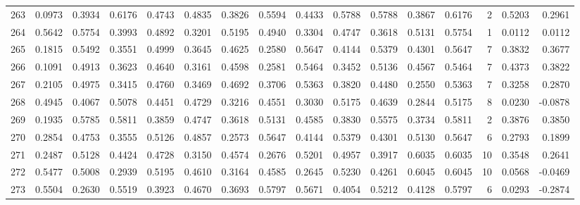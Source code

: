 \begin{tabular}{lrrrrrrrrrrrrrrr}
263 &      0.0973 &  0.3934 &  0.6176 &  0.4743 &  0.4835 &  0.3826 &  0.5594 &  0.4433 &  0.5788 &  0.5788 &   0.3867 &     0.6176 &      2 &                    0.5203 &                     0.2961 \\
264 &      0.5642 &  0.5754 &  0.3993 &  0.4892 &  0.3201 &  0.5195 &  0.4940 &  0.3304 &  0.4747 &  0.3618 &   0.5131 &     0.5754 &      1 &                    0.0112 &                     0.0112 \\
265 &      0.1815 &  0.5492 &  0.3551 &  0.4999 &  0.3645 &  0.4625 &  0.2580 &  0.5647 &  0.4144 &  0.5379 &   0.4301 &     0.5647 &      7 &                    0.3832 &                     0.3677 \\
266 &      0.1091 &  0.4913 &  0.3623 &  0.4640 &  0.3161 &  0.4598 &  0.2581 &  0.5464 &  0.3452 &  0.5136 &   0.4567 &     0.5464 &      7 &                    0.4373 &                     0.3822 \\
267 &      0.2105 &  0.4975 &  0.3415 &  0.4760 &  0.3469 &  0.4692 &  0.3706 &  0.5363 &  0.3820 &  0.4480 &   0.2550 &     0.5363 &      7 &                    0.3258 &                     0.2870 \\
268 &      0.4945 &  0.4067 &  0.5078 &  0.4451 &  0.4729 &  0.3216 &  0.4551 &  0.3030 &  0.5175 &  0.4639 &   0.2844 &     0.5175 &      8 &                    0.0230 &                    -0.0878 \\
269 &      0.1935 &  0.5785 &  0.5811 &  0.3859 &  0.4747 &  0.3618 &  0.5131 &  0.4585 &  0.3830 &  0.5575 &   0.3734 &     0.5811 &      2 &                    0.3876 &                     0.3850 \\
270 &      0.2854 &  0.4753 &  0.3555 &  0.5126 &  0.4857 &  0.2573 &  0.5647 &  0.4144 &  0.5379 &  0.4301 &   0.5130 &     0.5647 &      6 &                    0.2793 &                     0.1899 \\
271 &      0.2487 &  0.5128 &  0.4424 &  0.4728 &  0.3150 &  0.4574 &  0.2676 &  0.5201 &  0.4957 &  0.3917 &   0.6035 &     0.6035 &     10 &                    0.3548 &                     0.2641 \\
272 &      0.5477 &  0.5008 &  0.2939 &  0.5195 &  0.4610 &  0.3164 &  0.4585 &  0.2645 &  0.5230 &  0.4261 &   0.6045 &     0.6045 &     10 &                    0.0568 &                    -0.0469 \\
273 &      0.5504 &  0.2630 &  0.5519 &  0.3923 &  0.4670 &  0.3693 &  0.5797 &  0.5671 &  0.4054 &  0.5212 &   0.4128 &     0.5797 &      6 &                    0.0293 &                    -0.2874 \\

\end{tabular}
